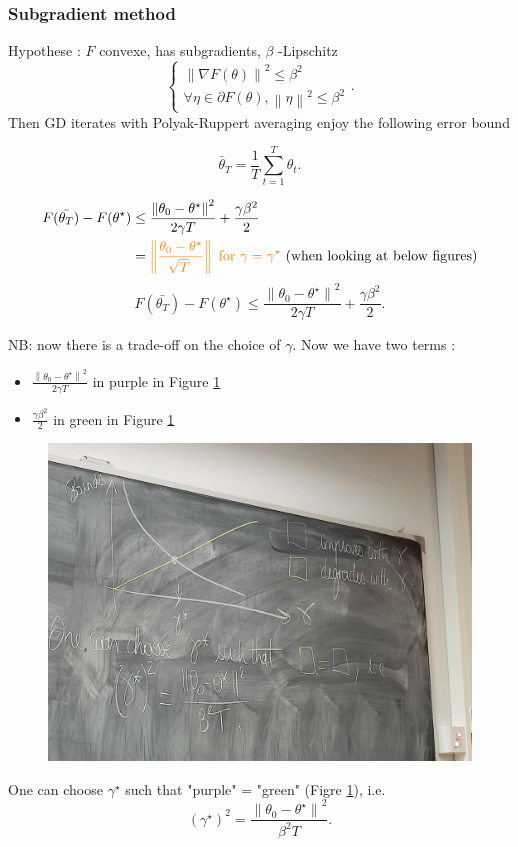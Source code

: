 \subsubsection{Subgradient method}
\begin{thm}
    Hypothese : $ F $ convexe, has subgradients, $ \beta  $ -Lipschitz 
        \[
            \begin{cases}
                \left\| \nabla F(\theta ) \right\| ^2 \leq \beta ^2\\
                \forall \eta \in \partial F(\theta), \left\| \eta  \right\| ^2 \leq \beta ^2
            \end{cases} 
        .\]
    Then GD iterates with Polyak-Ruppert averaging enjoy the following error bound 
    
    \[
        \bar{\theta }_T = \frac{1}{T} \sum_{t=1}^{T} \theta _t
    .\]
    
    \begin{align*}
        F(\bar{\theta_T}) - F(\theta ^{\star}) 
            &\leq \frac{\left\| \theta_0 - \theta ^{\star } \right\|^2 }{2 \gamma T} +  \frac{\gamma \beta ^2}{2} \\
            &= \textcolor{orange}{\left\| \frac{\theta _0 - \theta^{\star }}{\sqrt[]{T}} \right\| \text{ for } \gamma = \gamma ^{\star}} 
        \text{ (when looking at below figures)}
    \end{align*}
    \[
        F(\bar{\theta_T}) - F(\theta ^{\star}) \leq \frac{\left\| \theta_0 - \theta ^{\star } \right\|^2 }{2 \gamma T} +  \frac{\gamma \beta ^2}{2}     
    .\]
\end{thm}
NB: now there is a trade-off on the choice of $ \gamma  $. Now we have two terms : 
\begin{itemize}
    \item $ \frac{\left\| \theta_0 - \theta ^{\star } \right\|^2 }{2 \gamma T}  $ in purple in Figure \ref*{fig:tradeoff}
    \item $ \frac{\gamma \beta ^2}{2}  $ in green  in Figure \ref*{fig:tradeoff}
\end{itemize}
\begin{figure}[!h]
    \centering
    \includegraphics[width=.75\textwidth]{figs/gamma_compromise.jpg}
    \caption{ }
    \label{fig:tradeoff}
\end{figure}
One can choose $ \gamma ^\star  $ such that "purple" = "green" (Figre \ref*{fig:tradeoff}), i.e. 
\[
    (\gamma ^\star )^2 = \frac{\left\| \theta _0 - \theta ^\star  \right\| ^2}{\beta ^2 T}
.\]

